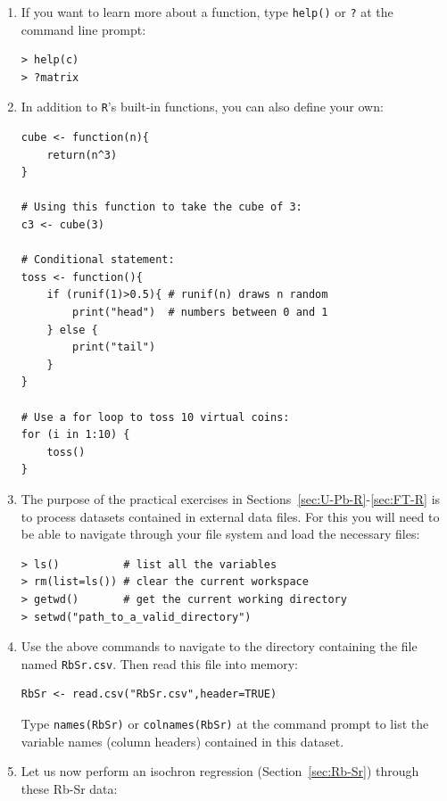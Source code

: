 \documentclass{book}
\begin{document}
\begin{enumerate}
\item If you want to learn more about a function, type \texttt{help()} or
\texttt{?} at the command line prompt:

\begin{verbatim}
> help(c)
> ?matrix
\end{verbatim}

\item In addition to \texttt{R}'s built-in functions, you can also define
  your own:

\begin{verbatim}
cube <- function(n){
    return(n^3)
}

# Using this function to take the cube of 3:
c3 <- cube(3)

# Conditional statement:
toss <- function(){
    if (runif(1)>0.5){ # runif(n) draws n random 
        print("head")  # numbers between 0 and 1
    } else {
        print("tail")
    }
}

# Use a for loop to toss 10 virtual coins:
for (i in 1:10) {
    toss()
}
\end{verbatim}

\item The purpose of the practical exercises in
  Sections~\ref{sec:U-Pb-R}-\ref{sec:FT-R} is to process datasets
  contained in external data files. For this you will need to be able
  to navigate through your file system and load the necessary files:

\begin{verbatim}
> ls()          # list all the variables
> rm(list=ls()) # clear the current workspace
> getwd()       # get the current working directory
> setwd("path_to_a_valid_directory")
\end{verbatim}

\item Use the above commands to navigate to the directory containing the
file named \texttt{RbSr.csv}. Then read this file into memory:

\begin{verbatim}
RbSr <- read.csv("RbSr.csv",header=TRUE)
\end{verbatim}

Type \texttt{names(RbSr)} or \texttt{colnames(RbSr)} at the command
prompt to list the variable names (column headers) contained in this
dataset.

\item Let us now perform an isochron regression
  (Section~\ref{sec:Rb-Sr}) through these Rb-Sr data: \label{itm:lm}


\end{enumerate}
\end{document}
